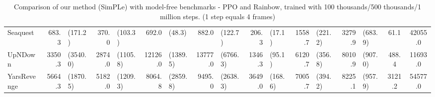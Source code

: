 \begin{landscape}
\begin{changemargin}{0cm}{0cm}
\begin{center}
\begin{table}[!htbp]
\begin{tabular}{l|rl|rl|rl|rl|rl|rl|rl|c|c}
Seaquest       &    683.3 &    (171.2) &    370.0 &   (103.3) &      692.0 &       (48.3) &    882.0 &    (122.7) &    206.3 &   (17.1) &   1558.7 &    (221.2) &    3279.9 &    (683.9) &     61.1 &  42055.0 \\
UpNDown        &   3350.3 &   (3540.0) &   2874.0 &  (1105.8) &    12126.0 &     (1389.5) &  13777.0 &   (6766.3) &   1346.3 &   (95.1) &   6120.7 &    (356.8) &    8010.9 &    (907.0) &    488.4 &  11693.0 \\
YarsRevenge    &   5664.3 &   (1870.5) &   5182.0 &  (1209.3) &     8064.8 &     (2859.8) &   9495.0 &   (2638.3) &   3649.0 &  (168.6) &   7005.7 &    (394.2) &    8225.1 &    (957.9) &   3121.2 &  54577.0 \\

\end{tabular}
\caption{Comparison of our method (SimPLe) with model-free benchmarks - PPO and Rainbow, trained with 100 thousands/500 thousands/1 million steps. (1 step equals 4 frames)}
\label{tab:ppo_rainbow_comparison}
\end{table}
\vspace*{\fill}
\end{center}
\end{changemargin}
\end{landscape}




